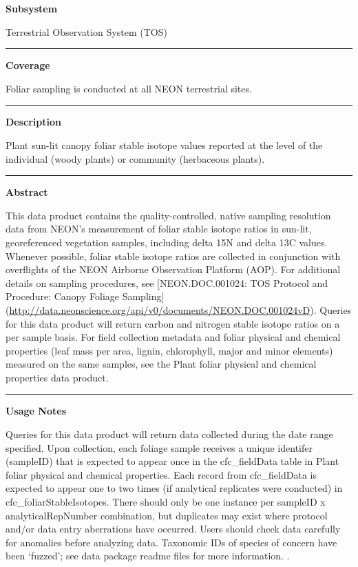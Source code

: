 \documentclass[]{article}
\begin{document}
\textbf{Subsystem}

Terrestrial Observation System (TOS)

\begin{center}\rule{0.5\linewidth}{\linethickness}\end{center}

\textbf{Coverage}

Foliar sampling is conducted at all NEON terrestrial sites.

\begin{center}\rule{0.5\linewidth}{\linethickness}\end{center}

\textbf{Description}

Plant sun-lit canopy foliar stable isotope values reported at the level
of the individual (woody plants) or community (herbaceous plants).

\begin{center}\rule{0.5\linewidth}{\linethickness}\end{center}

\textbf{Abstract}

This data product contains the quality-controlled, native sampling
resolution data from NEON's measurement of foliar stable isotope ratios
in sun-lit, georeferenced vegetation samples, including delta 15N and
delta 13C values. Whenever possible, foliar stable isotope ratios are
collected in conjunction with overflights of the NEON Airborne
Observation Platform (AOP). For additional details on sampling
procedures, see {[}NEON.DOC.001024: TOS Protocol and Procedure: Canopy
Foliage Sampling{]}
(\url{http://data.neonscience.org/api/v0/documents/NEON.DOC.001024vD}).
Queries for this data product will return carbon and nitrogen stable
isotope ratios on a per sample basis. For field collection metadata and
foliar physical and chemical properties (leaf mass per area, lignin,
chlorophyll, major and minor elements) measured on the same samples, see
the Plant foliar physical and chemical properties data product.

\begin{center}\rule{0.5\linewidth}{\linethickness}\end{center}

\textbf{Usage Notes}

Queries for this data product will return data collected during the date
range specified. Upon collection, each foliage sample receives a unique
identifer (sampleID) that is expected to appear once in the
cfc\_fieldData table in Plant foliar physical and chemical properties.
Each record from cfc\_fieldData is expected to appear one to two times
(if analytical replicates were conducted) in cfc\_foliarStableIsotopes.
There should only be one instance per sampleID x analyticalRepNumber
combination, but duplicates may exist where protocol and/or data entry
aberrations have occurred. Users should check data carefully for
anomalies before analyzing data. Taxonomic IDs of species of concern
have been `fuzzed'; see data package readme files for more information.
\newpage
.
\end{document}

